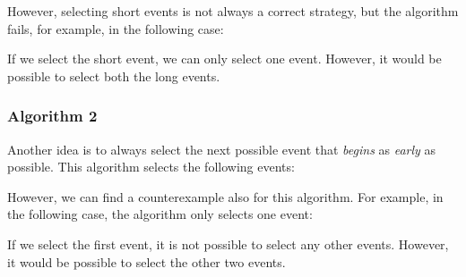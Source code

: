However, selecting short events is not always
a correct strategy, but the algorithm fails,
for example, in the following case:
\begin{center}
\end{center}
If we select the short event, we can only select one event.
However, it would be possible to select both the long events.

\subsubsection*{Algorithm 2}

Another idea is to always select the next possible
event that \emph{begins} as \emph{early} as possible.
This algorithm selects the following events:
\begin{center}
\end{center}

However, we can find a counterexample
also for this algorithm.
For example, in the following case,
the algorithm only selects one event:
\begin{center}
\end{center}
If we select the first event, it is not possible
to select any other events.
However, it would be possible to select the
other two events.

